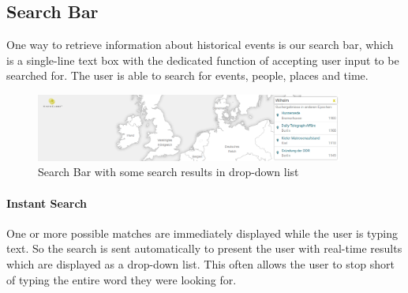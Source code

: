 \subsection{Search Bar}

One way to retrieve information about historical events is our search bar, which is a single-line text box with the dedicated function of accepting user input to be searched for. The user is able to search for events, people, places and time. 

\begin{figure}[H]
  \begin{center}
    \includegraphics[width=0.9\textwidth]{graphics/search.png}
  \end{center}
  \caption{Search Bar with some search results in drop-down list}
  \label{fig:search}
\end{figure}

\paragraph{Instant Search} %
\label{par:instant_search}
One or more possible matches are immediately displayed while the user is typing text. So the search is sent automatically to present the user with real-time results which are displayed as a drop-down list. This often allows the user to stop short of typing the entire word they were looking for.